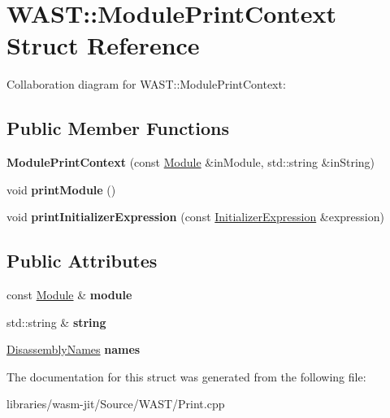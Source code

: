 \hypertarget{struct_w_a_s_t_1_1_module_print_context}{}\section{W\+A\+ST\+:\+:Module\+Print\+Context Struct Reference}
\label{struct_w_a_s_t_1_1_module_print_context}


Collaboration diagram for W\+A\+ST\+:\+:Module\+Print\+Context\+:
\subsection*{Public Member Functions}
\begin{DoxyCompactItemize}
\item 
\mbox{\label{struct_w_a_s_t_1_1_module_print_context_af74738583b60f290a11ebfcd97aa59f8}} 
{\bfseries Module\+Print\+Context} (const \mbox{\hyperlink{struct_i_r_1_1_module}{Module}} \&in\+Module, std\+::string \&in\+String)
\item 
\mbox{\label{struct_w_a_s_t_1_1_module_print_context_ab75276391887f1a04fe297e96d2e2bbd}} 
void {\bfseries print\+Module} ()
\item 
\mbox{\label{struct_w_a_s_t_1_1_module_print_context_a1b9eb83a801691692967eb02fdf17893}} 
void {\bfseries print\+Initializer\+Expression} (const \mbox{\hyperlink{struct_i_r_1_1_initializer_expression}{Initializer\+Expression}} \&expression)
\end{DoxyCompactItemize}
\subsection*{Public Attributes}
\begin{DoxyCompactItemize}
\item 
\mbox{\label{struct_w_a_s_t_1_1_module_print_context_a25c5a4b70a1e7c2481995985d5d87c3c}} 
const \mbox{\hyperlink{struct_i_r_1_1_module}{Module}} \& {\bfseries module}
\item 
\mbox{\label{struct_w_a_s_t_1_1_module_print_context_aa08b8c5c3fd81ab5f926e12687387653}} 
std\+::string \& {\bfseries string}
\item 
\mbox{\label{struct_w_a_s_t_1_1_module_print_context_aad231941cfac78cfbf964f73a66a5b2c}} 
\mbox{\hyperlink{struct_i_r_1_1_disassembly_names}{Disassembly\+Names}} {\bfseries names}
\end{DoxyCompactItemize}


The documentation for this struct was generated from the following file\+:\begin{DoxyCompactItemize}
\item 
libraries/wasm-\/jit/\+Source/\+W\+A\+S\+T/Print.\+cpp\end{DoxyCompactItemize}
